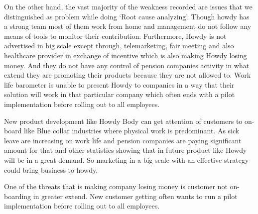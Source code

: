 \noindent On the other hand, the vast majority of the weakness recorded are issues that we distinguished as problem while doing ‘Root cause analyzing’. Though howdy has a strong team most of them work from home and management do not follow any means of tools to monitor their contribution. Furthermore, Howdy is not advertised in big scale except through, telemarketing, fair meeting and also healthcare provider in exchange of incentive which is also making Howdy losing money. And they do not have any control of pension companies activity in what extend they are promoting their products because they are not allowed to. Work life barometer is unable to present Howdy to companies in a way that their solution will work in that particular company which often ends with a pilot implementation before rolling out to all employees.

\noindent New product development like Howdy Body can get attention of customers to on-board like Blue collar industries where physical work is predominant. As sick leave are increasing on work life and pension companies are paying significant amount for that and other statistics showing that in future product like Howdy will be in a great demand. So marketing in a big scale with an effective strategy could bring business to howdy.

\noindent One of the threats that is making company losing money is customer not on-boarding in greater extend. New customer getting often wants to run a pilot implementation before rolling out to all employees.
